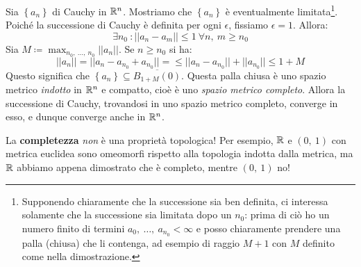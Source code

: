 \begin{demonstration}
	Sia $\left\{a_n\right\}$ di Cauchy in $\mathbb{R}^n$. Mostriamo che $\left\{a_n\right\}$ è eventualmente limitata\footnote{Supponendo chiaramente che la successione sia ben definita, ci interessa solamente che la successione sia limitata dopo un $n_0$: prima di ciò ho un numero finito di termini $a_0,\ \ldots,\ a_{n_0}<\infty$ e posso chiaramente prendere una palla (chiusa) che li contenga, ad esempio di raggio $M+1$ con $M$ definito come nella dimostrazione.}.\\
	Poiché la successione di Cauchy è definita per ogni $\epsilon$, fissiamo $\epsilon=1$. Allora:
	\begin{equation*}
	\exists n_0\ \colon \lvert\lvert a_n-a_m\rvert\rvert\leq 1\ \forall n,\ m\geq n_0
	\end{equation*}
Sia $M\coloneqq \max_{n_0,\ \ldots,\ n_0}\lvert\lvert a_n\rvert\rvert$. Se $n\geq n_0$ si ha:
\begin{equation*}
\lvert\lvert a_n\rvert\rvert=\lvert\lvert a_n - a_{n_0}+ a_{n_0}\rvert\rvert=\leq \lvert\lvert a_n - a_{n_0}\rvert\rvert+\lvert\lvert a_{n_0}\rvert\rvert\leq 1+M
\end{equation*}
Questo significa che $\left\{a_n\right\}\subseteq\overline{B_{1+M}\left(0\right)}$. Questa palla chiusa è uno spazio metrico \textit{indotto} in $\mathbb{R}^n$ e compatto, cioè è uno \textit{spazio metrico completo}. Allora la successione di Cauchy, trovandosi in uno spazio metrico completo, converge in esso, e dunque converge anche in $\mathbb{R}^n$.
\end{demonstration}
\begin{attention}
La \textbf{completezza} \textit{non} è una proprietà topologica! Per esempio, $\mathbb{R}$ e $\left(0,\ 1\right)$ con metrica euclidea sono omeomorfi rispetto alla topologia indotta dalla metrica, ma $\mathbb{R}$ abbiamo appena dimostrato che è completo, mentre $\left(0,\ 1\right)$ no!
\end{attention}